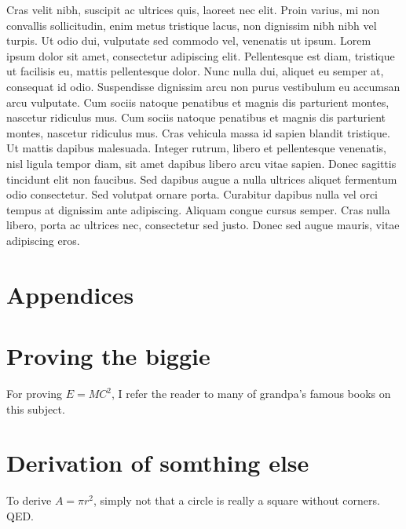\documentclass[botnum,fleqn,final]{unmeethesis}
\begin{document}
Cras velit nibh, suscipit ac ultrices quis, laoreet nec elit. Proin varius, mi
non convallis sollicitudin, enim metus tristique lacus, non dignissim nibh nibh
vel turpis. Ut odio dui, vulputate sed commodo vel, venenatis ut ipsum. Lorem
ipsum dolor sit amet, consectetur adipiscing elit. Pellentesque est diam,
tristique ut facilisis eu, mattis pellentesque dolor. Nunc nulla dui, aliquet
eu semper at, consequat id odio. Suspendisse dignissim arcu non purus
vestibulum eu accumsan arcu vulputate. Cum sociis natoque penatibus et magnis
dis parturient montes, nascetur ridiculus mus. Cum sociis natoque penatibus et
magnis dis parturient montes, nascetur ridiculus mus. Cras vehicula massa id
sapien blandit tristique. Ut mattis dapibus malesuada. Integer rutrum, libero
et pellentesque venenatis, nisl ligula tempor diam, sit amet dapibus libero
arcu vitae sapien. Donec sagittis tincidunt elit non faucibus. Sed dapibus
augue a nulla ultrices aliquet fermentum odio consectetur. Sed volutpat ornare
porta. Curabitur dapibus nulla vel orci tempus at dignissim ante adipiscing.
Aliquam congue cursus semper. Cras nulla libero, porta ac ultrices nec,
consectetur sed justo. Donec sed augue mauris, vitae adipiscing eros.

\chapter*{Appendices}


\appendix
\chapter{Proving the biggie}
   For proving $E=MC^2$, I refer the reader to many of grandpa's famous books on this subject.
\chapter{Derivation of somthing else}
   To derive $A = \pi r^2$, simply not that a circle is really a square without corners.  QED.

%


\end{document}

